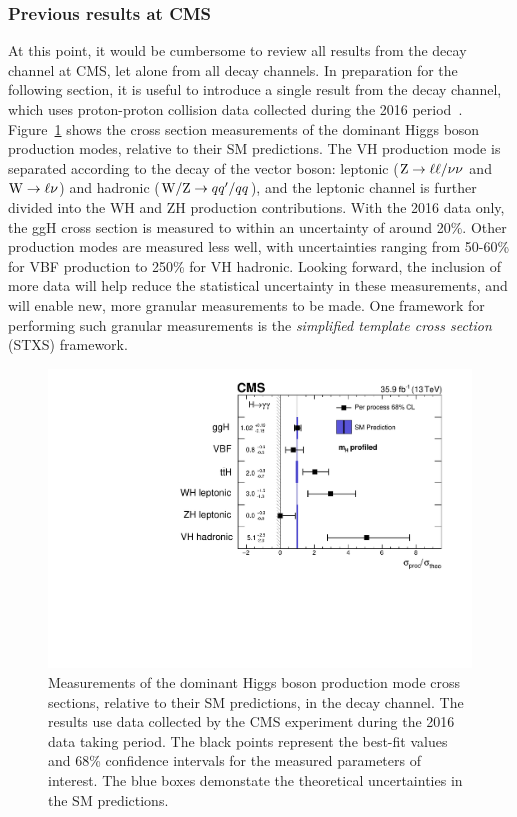 \subsubsection{Previous \Hgg results at CMS}
At this point, it would be cumbersome to review all results from the \Hgg decay channel at CMS, let alone from all decay channels. In preparation for the following section, it is useful to introduce a single result from the \Hgg decay channel, which uses proton-proton collision data collected during the 2016 period~\cite{Sirunyan:2018ouh}. Figure~\ref{fig:hig16040_stage0} shows the cross section measurements of the dominant Higgs boson production modes, relative to their SM predictions. The VH production mode is separated according to the decay of the vector boson: leptonic (${\rm{Z}}\rightarrow\ell\ell/\nu\nu$ and ${\rm{W}}\rightarrow\ell\nu$) and hadronic (${\rm{W/Z}}\rightarrow qq'/qq$), and the leptonic channel is further divided into the WH and ZH production contributions. With the 2016 data only, the ggH cross section is measured to within an uncertainty of around 20\%. Other production modes are measured less well, with uncertainties ranging from 50-60\% for VBF production to 250\% for VH hadronic. Looking forward, the inclusion of more data will help reduce the statistical uncertainty in these measurements, and will enable new, more granular measurements to be made. One framework for performing such granular measurements is the \textit{simplified template cross section} (STXS) framework.

\begin{figure}
  \centering
  \includegraphics[width=.7\linewidth]{Figures/theory/hig16040_stage0.pdf}
  \caption[Measurements of Higgs boson production cross section in the \Hgg channel, using the 2016 data set]
  {
    Measurements of the dominant Higgs boson production mode cross sections, relative to their SM predictions, in the \Hgg decay channel. The results use data collected by the CMS experiment during the 2016 data taking period. The black points represent the best-fit values and 68\% confidence intervals for the measured parameters of interest. The blue boxes demonstate the theoretical uncertainties in the SM predictions.
  }
  \label{fig:hig16040_stage0}
\end{figure}

